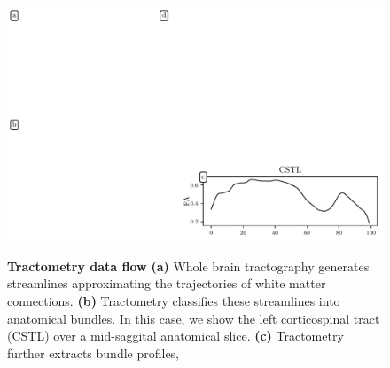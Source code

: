\documentclass[10pt,%
               aps,%
               prl,%
               reprint,%
               superscriptaddress,%
               preprintnumbers,%
               linenumbers,%
               amsmath,%
               floatfix]{revtex4-1}
\begin{document}
\begin{figure}[h!]
    \vspace{0.25cm}
    \vspace{-5.25cm}
    \includegraphics[width=\columnwidth]{method-quad.pdf}
    {\label{fig:methods:tractogram}}
    {\label{fig:methods:cst}}
    {\label{fig:methods:tract-profile}}
    {\label{fig:methods:group-structure}}
    \caption{{\bf Tractometry data flow}
        \label{fig:methods}
        {\bf (a)} Whole brain tractography generates streamlines approximating
        the trajectories of white matter connections.
        {\bf (b)} Tractometry classifies these streamlines into anatomical bundles.
        In this case, we show the left corticospinal tract (CSTL) over a mid-saggital
        anatomical slice.
        {\bf (c)} Tractometry further extracts bundle profiles,
}
\end{figure}
\end{document}

